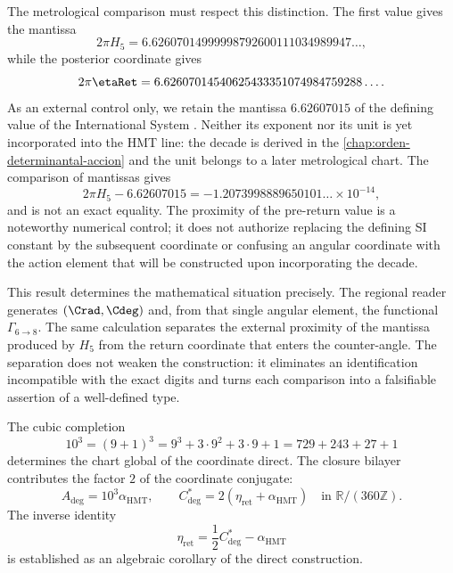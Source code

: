 The metrological comparison must respect this distinction. The first value gives
the mantissa
\[
2\pi H_5
=6.62607014999998792600111034989947\ldots,
\]
while the posterior coordinate gives
\[
2\pi\etaRet
=6.62607014540625433351074984759288\ldots.
\]
As an external control only, we retain the mantissa \(6.62607015\) of the
defining value of the International System \cite{BIPMSI}. Neither its exponent nor its unit is yet incorporated into the HMT line: the decade is derived in the
\cref{chap:orden-determinantal-accion} and the unit belongs to a later
metrological chart. The comparison of mantissas gives
\[
2\pi H_5-6.62607015
=-1.2073998889650101\ldots\times10^{-14},
\]
and is not an exact equality. The proximity of the pre-return value is
a noteworthy numerical control; it does not authorize replacing the defining SI
constant by the subsequent coordinate or confusing an angular coordinate with
the action element that will be constructed upon incorporating the decade.

This result determines the mathematical situation precisely. The regional
reader generates \((\Crad,\Cdeg)\) and, from that single angular element, the functional
\(\Gamma_{6\to8}\). The same calculation separates the external proximity of the
mantissa produced by \(H_5\) from the return coordinate that enters the
counter-angle. The separation does not weaken the construction: it eliminates an
identification incompatible with the exact digits and turns each
comparison into a falsifiable assertion of a well-defined type.

\label{sec:l9s102:par-angular}

The cubic completion
\begin{equation}
 10^3=(9+1)^3=9^3+3\cdot9^2+3\cdot9+1
 =729+243+27+1
 \label{eq:l9s102:base-1000}
\end{equation}
determines the chart global of the coordinate direct. The closure bilayer contributes
the factor \(2\) of the coordinate conjugate:
\begin{equation}
 \boxed{
 A_{\deg}=10^3\alpha_{\mathrm{HMT}},
 \qquad
 C^*_{\deg}=2(\eta_{\mathrm{ret}}+\alpha_{\mathrm{HMT}})
 \quad\text{in }\mathbb R/(360\mathbb Z).}
 \label{eq:l9s102:a-cstar-deg}
\end{equation}
The inverse identity
\begin{equation}
 \eta_{\mathrm{ret}}=\frac12C^*_{\deg}-\alpha_{\mathrm{HMT}}
 \label{eq:l9s102:eta-corolario-inverso}
\end{equation}
is established as an algebraic corollary of the direct construction.

